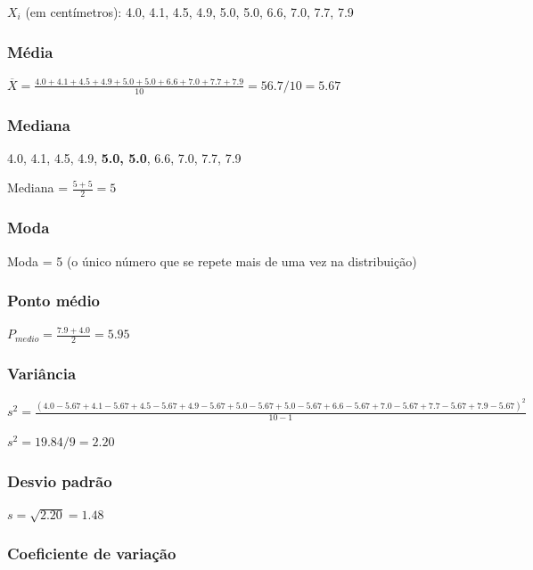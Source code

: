\documentclass[
]{book}
\begin{document}
\(X_i\) (em centímetros): 4.0, 4.1, 4.5, 4.9, 5.0, 5.0, 6.6, 7.0, 7.7, 7.9

\hypertarget{muxe9dia}{%
\subsubsection{Média}\label{muxe9dia}}

\(\overline{X}=\frac{4.0+4.1+4.5+4.9+5.0+5.0+6.6+7.0+7.7+7.9}{10}=56.7/10=5.67\)

\hypertarget{mediana}{%
\subsubsection{Mediana}\label{mediana}}

4.0, 4.1, 4.5, 4.9, \textbf{5.0, 5.0}, 6.6, 7.0, 7.7, 7.9

Mediana = \(\frac{5 + 5}{2} = 5\)

\hypertarget{moda}{%
\subsubsection{Moda}\label{moda}}

Moda = 5 (o único número que se repete mais de uma vez na distribuição)

\hypertarget{ponto-muxe9dio}{%
\subsubsection{Ponto médio}\label{ponto-muxe9dio}}

\(P_{medio}=\frac{7.9 + 4.0}{2} = 5.95\)

\hypertarget{variuxe2ncia}{%
\subsubsection{Variância}\label{variuxe2ncia}}

\(s^2=\frac{(4.0-5.67+4.1-5.67+4.5-5.67+4.9-5.67+5.0-5.67+5.0-5.67+6.6-5.67+7.0-5.67+7.7-5.67+7.9-5.67)^2}{10-1}\)

\(s^2 = 19.84/9 = 2.20\)

\hypertarget{desvio-padruxe3o}{%
\subsubsection{Desvio padrão}\label{desvio-padruxe3o}}

\(s=\sqrt{2.20} = 1.48\)

\hypertarget{coeficiente-de-variauxe7uxe3o}{%
\subsubsection{Coeficiente de variação}\label{coeficiente-de-variauxe7uxe3o}}
\end{document}
